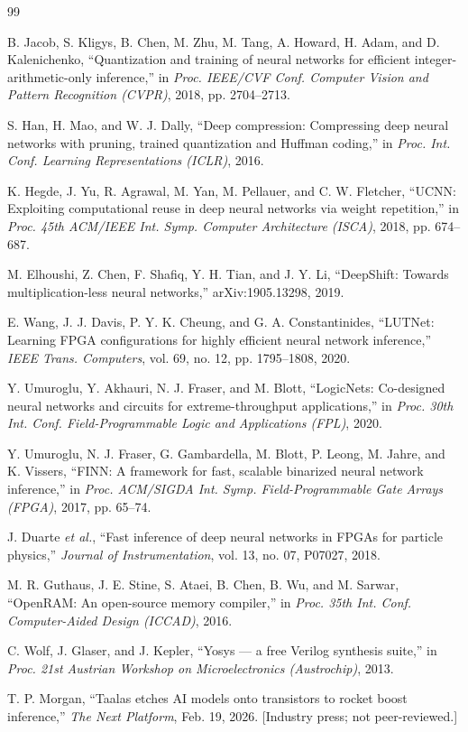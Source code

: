 \documentclass[conference]{IEEEtran}
\begin{document}
\begin{thebibliography}{99}

 B. Jacob, S. Kligys, B. Chen, M. Zhu, M. Tang, A. Howard,
H. Adam, and D. Kalenichenko, ``Quantization and training of neural networks for
efficient integer-arithmetic-only inference,'' in \emph{Proc. IEEE/CVF Conf.
Computer Vision and Pattern Recognition (CVPR)}, 2018, pp. 2704--2713.

 S. Han, H. Mao, and W. J. Dally, ``Deep compression:
Compressing deep neural networks with pruning, trained quantization and Huffman
coding,'' in \emph{Proc. Int. Conf. Learning Representations (ICLR)}, 2016.

 K. Hegde, J. Yu, R. Agrawal, M. Yan, M. Pellauer, and
C. W. Fletcher, ``UCNN: Exploiting computational reuse in deep neural networks
via weight repetition,'' in \emph{Proc. 45th ACM/IEEE Int. Symp. Computer
Architecture (ISCA)}, 2018, pp. 674--687.

 M. Elhoushi, Z. Chen, F. Shafiq, Y. H. Tian, and J. Y. Li,
``DeepShift: Towards multiplication-less neural networks,'' arXiv:1905.13298,
2019.

 E. Wang, J. J. Davis, P. Y. K. Cheung, and G. A. Constantinides,
``LUTNet: Learning FPGA configurations for highly efficient neural network
inference,'' \emph{IEEE Trans. Computers}, vol. 69, no. 12, pp. 1795--1808,
2020.

 Y. Umuroglu, Y. Akhauri, N. J. Fraser, and M. Blott,
``LogicNets: Co-designed neural networks and circuits for extreme-throughput
applications,'' in \emph{Proc. 30th Int. Conf. Field-Programmable Logic and
Applications (FPL)}, 2020.

 Y. Umuroglu, N. J. Fraser, G. Gambardella, M. Blott, P. Leong,
M. Jahre, and K. Vissers, ``FINN: A framework for fast, scalable binarized
neural network inference,'' in \emph{Proc. ACM/SIGDA Int. Symp.
Field-Programmable Gate Arrays (FPGA)}, 2017, pp. 65--74.

 J. Duarte \emph{et al.}, ``Fast inference of deep neural
networks in FPGAs for particle physics,'' \emph{Journal of Instrumentation},
vol. 13, no. 07, P07027, 2018.

 M. R. Guthaus, J. E. Stine, S. Ataei, B. Chen, B. Wu, and
M. Sarwar, ``OpenRAM: An open-source memory compiler,'' in \emph{Proc. 35th
Int. Conf. Computer-Aided Design (ICCAD)}, 2016.

 C. Wolf, J. Glaser, and J. Kepler, ``Yosys --- a free Verilog
synthesis suite,'' in \emph{Proc. 21st Austrian Workshop on Microelectronics
(Austrochip)}, 2013.

 T. P. Morgan, ``Taalas etches AI models onto transistors to
rocket boost inference,'' \emph{The Next Platform}, Feb. 19, 2026. [Industry
press; not peer-reviewed.]

\end{thebibliography}
\end{document}
